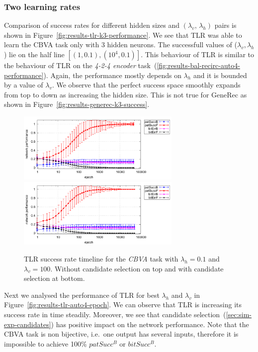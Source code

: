 \subsubsection{Two learning rates} 
\label{sec:tlr-k3}

Comparison of success rates for different hidden sizes and $(\lambda_v,\,\lambda_h)$ pairs is shown in Figure~\ref{fig:results-tlr-k3-performance}. We see that TLR was able to learn the CBVA task only with 3 hidden neurons. The successfull values of ($\lambda_v, \lambda_h$) lie on the half line $[(1, 0.1), (10^4, 0.1)]$. This behaviour of TLR is similar to the behaviour of TLR on the \emph{4-2-4 encoder} task~(\ref{fig:results-bal-recirc-auto4-performance}). Again, the performance mostly depends on $\lambda_h$ and it is bounded by a value of $\lambda_v$. We observe that the perfect success space smoothly expands from top to down as increasing the hidden size. This is not true for GeneRec as shown in Figure~\ref{fig:results-generec-k3-success}. 

\begin{figure}[H]
  \centering
  \includegraphics[width=0.7\textwidth]{img/tlr-k3-3-best-perf.pdf}   
  \includegraphics[width=0.7\textwidth]{img/tlr-k3-3-best-can.pdf}      
  \caption{TLR success rate timeline for the \emph{CBVA} task with $\lambda_h=0.1$ and $\lambda_v=100$. Without candidate selection on top and with candidate selection at bottom.}
  \label{fig:results-tlr-k3-epoch} 
\end{figure}

Next we analysed the performance of TLR for best $\lambda_h$ and $\lambda_v$ in Figure~\ref{fig:results-tlr-auto4-epoch}. We can observe that TLR is increasing its success rate in time steadily. Moreover, we see that candidate selection~(\ref{sec:sim-exp-candidates}) has positive impact on the network performance.
Note that the CBVA task is non bijective, i.e.~one output has several inputs, therefore it is impossible to achieve 100\% $patSucc^B$ or $bitSucc^B$. 

